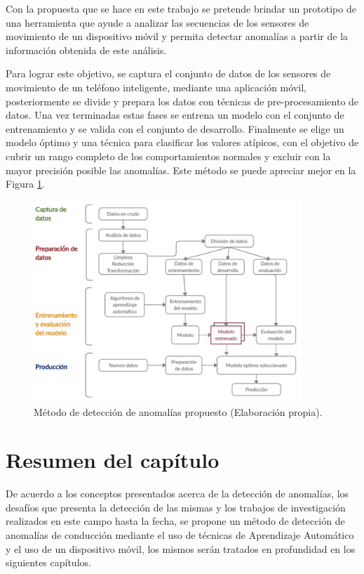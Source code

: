 \vspace{5mm} %

Con la propuesta que se hace en este trabajo se pretende brindar un prototipo de una herramienta que ayude a analizar las secuencias de los sensores de movimiento de un dispositivo m\'{o}vil y permita detectar anomalías a partir de la información obtenida de este análisis. 

\vspace{5mm} %

Para lograr este objetivo, se captura el conjunto de datos de los sensores de movimiento de un tel\'{e}fono inteligente, mediante una aplicaci\'{o}n m\'{o}vil, posteriormente se divide y prepara los datos con t\'{e}cnicas de pre-procesamiento de datos. Una vez terminadas estas fases se entrena un modelo con el conjunto de entrenamiento y se valida con el conjunto de desarrollo. Finalmente se elige un modelo \'{o}ptimo y una t\'{e}cnica para clasificar los valores at\'{i}picos, con el objetivo de cubrir un rango completo de los comportamientos normales y excluir con la mayor precisi\'{o}n posible las anomal\'{i}as. Este m\'{e}todo se puede apreciar mejor en la Figura \ref{fig:modeloAnomalias}.

\begin{figure}[h!]
  \begin{center}	\includegraphics[width=0.90\textwidth,frame]{imagenes/Cap2/metodo1}
  \caption{M\'{e}todo de detecci\'{o}n de anomal\'{i}as propuesto (Elaboraci\'{o}n propia).}
  \label{fig:modeloAnomalias}
  \end{center}
\end{figure}

\section{Resumen del cap\'{i}tulo}

De acuerdo a los conceptos presentados acerca de la detecci\'{o}n de anomal\'{i}as, los desaf\'{i}os  que presenta la detecci\'{o}n de las mismas y los trabajos de investigaci\'{o}n realizados en este campo hasta la fecha, se propone un m\'{e}todo de detecci\'{o}n de anomal\'{i}as de conducci\'{o}n mediante el uso de t\'{e}cnicas de Aprendizaje Autom\'{a}tico y el uso de un dispositivo m\'{o}vil, los mismos ser\'{a}n tratados en profundidad en los siguientes cap\'{i}tulos.
